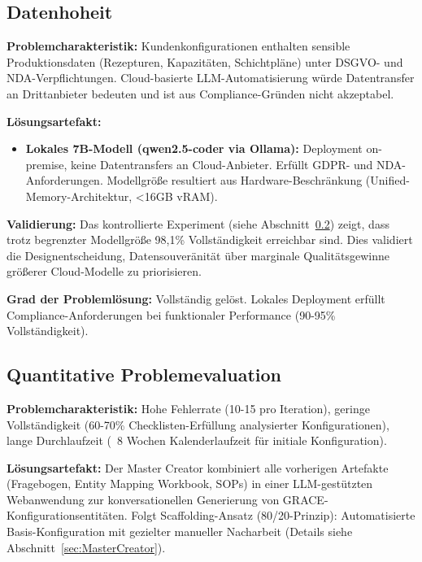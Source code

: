 \subsection{Datenhoheit}
\label{subsec:DatenhoheitEval}

\textbf{Problemcharakteristik:} Kundenkonfigurationen enthalten sensible Produktionsdaten (Rezepturen, Kapazitäten, Schichtpläne) unter DSGVO- und NDA-Verpflichtungen. Cloud-basierte LLM-Automatisierung würde Datentransfer an Drittanbieter bedeuten und ist aus Compliance-Gründen nicht akzeptabel.

\textbf{Lösungsartefakt:}

\begin{itemize}
    \item \textbf{Lokales 7B-Modell (qwen2.5-coder via Ollama):} Deployment on-premise, keine Datentransfers an Cloud-Anbieter. Erfüllt GDPR- und NDA-Anforderungen. Modellgröße resultiert aus Hardware-Beschränkung (Unified-Memory-Architektur, <16GB vRAM).
\end{itemize}

\noindent \textbf{Validierung:} Das kontrollierte Experiment (siehe Abschnitt~\ref{subsec:QuantitativeEval}) zeigt, dass trotz begrenzter Modellgröße 98,1\% Vollständigkeit erreichbar sind. Dies validiert die Designentscheidung, Datensouveränität über marginale Qualitätsgewinne größerer Cloud-Modelle zu priorisieren.

\noindent \textbf{Grad der Problemlösung:} Vollständig gelöst. Lokales Deployment erfüllt Compliance-Anforderungen bei funktionaler Performance (90-95\% Vollständigkeit).


\subsection{Quantitative Problemevaluation}
\label{subsec:QuantitativeEval}

\textbf{Problemcharakteristik:} Hohe Fehlerrate (10-15 pro Iteration), geringe Vollständigkeit (60-70\% Checklisten-Erfüllung analysierter Konfigurationen), lange Durchlaufzeit (~8 Wochen Kalenderlaufzeit für initiale Konfiguration).

\noindent \textbf{Lösungsartefakt:} Der Master Creator kombiniert alle vorherigen Artefakte (Fragebogen, Entity Mapping Workbook, SOPs) in einer LLM-gestützten Webanwendung zur konversationellen Generierung von GRACE-Konfigurationsentitäten. Folgt Scaffolding-Ansatz (80/20-Prinzip): Automatisierte Basis-Konfiguration mit gezielter manueller Nacharbeit (Details siehe Abschnitt~\ref{sec:MasterCreator}).

